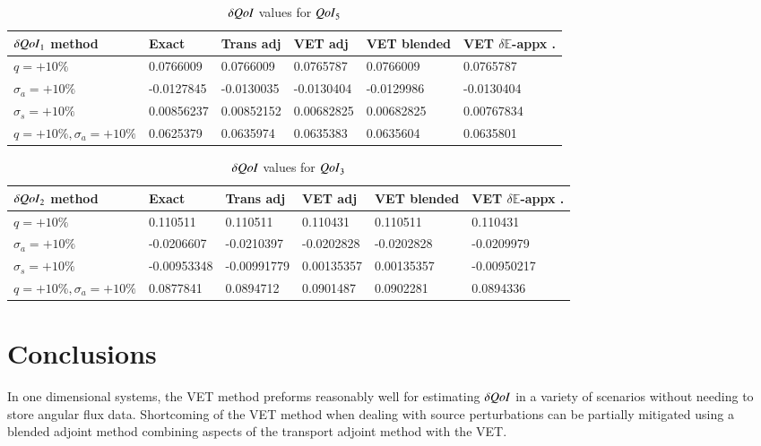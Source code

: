 \documentclass{anstrans}
\newcommand{\Edd}{\mathbb{E}}
\newcommand{\sigs}{\sigma_s}
\newcommand{\siga}{\sigma_a}
\newcommand{\qoi}{{\it QoI}\xspace}
\begin{document}
\begin{table}
  \centering
  \caption{$\delta \qoi$ values for $\qoi_5$}
  \begin{tabular}{l|lllll}\toprule
  $\delta\qoi_1$ method    & Exact     & Trans adj     & VET adj      &   VET blended  & VET $\delta \Edd$-appx .
\\ \midrule
$q=+10\%$  & 0.0766009  & 0.0766009  & 0.0765787 & 0.0766009  & 0.0765787
\\
$\siga=+10\%$  &-0.0127845  & -0.0130035 & -0.0130404  & -0.0129986 & -0.0130404
\\
$\sigs=+10\%$  & 0.00856237  & 0.00852152  & 0.00682825  & 0.00682825  & 0.00767834 
\\
$q=+10\%,\siga=+10\%$  & 0.0625379 & 0.0635974  & 0.0635383 & 0.0635604  &  0.0635801 
\\
\bottomrule
\end{tabular}
  \label{tab:qoi1}
\end{table}


\begin{table}
  \centering
  \caption{$\delta \qoi$ values for $\qoi_3$}
  \begin{tabular}{l|lllll}\toprule
  $\delta\qoi_2$ method    & Exact     & Trans adj     & VET adj      &   VET blended  & VET $\delta \Edd$-appx .
\\ \midrule
$q=+10\%$  & 0.110511   & 0.110511   & 0.110431 & 0.110511   & 0.110431 
\\
$\siga=+10\%$  &-0.0206607  & -0.0210397 & -0.0202828   & -0.0202828  & -0.0209979
\\
$\sigs=+10\%$  & -0.00953348   & -0.00991779   & 0.00135357   & 0.00135357   & -0.00950217 
\\
$q=+10\%,\siga=+10\%$  & 0.0877841  & 0.0894712   & 0.0901487 & 0.0902281   &  0.0894336  
\\
\bottomrule
\end{tabular}
  \label{tab:qoi2}
\end{table}



\section{Conclusions}
In one dimensional systems, the VET method preforms reasonably well for estimating $\delta \qoi$ in a  variety of scenarios without needing to store angular flux data. Shortcoming of the VET method when dealing with source perturbations can be partially mitigated using a blended adjoint method combining aspects of the transport adjoint method with the VET. 
\end{document}
